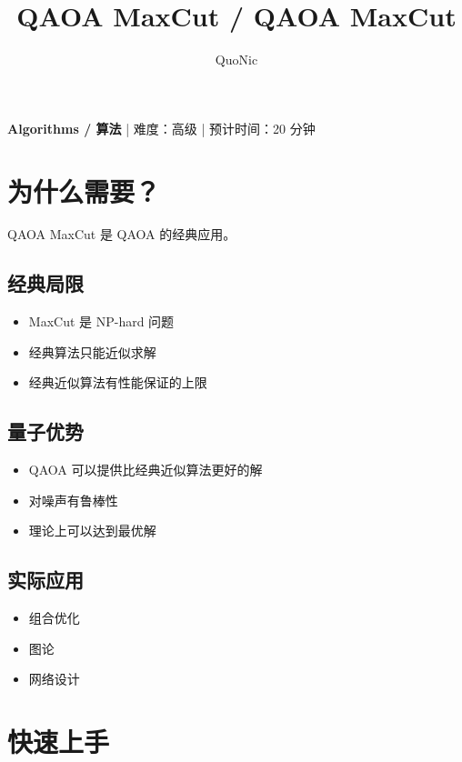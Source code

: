 \documentclass[12pt,a4paper]{article}
\title{QAOA MaxCut / QAOA MaxCut}
\author{QuoNic}
\date{}
\begin{document}
\maketitle

\begin{center}
\textbf{Algorithms / 算法} | 难度：高级 | 预计时间：20 分钟
\end{center}

\tableofcontents
\newpage

\section{为什么需要？}

QAOA MaxCut 是 QAOA 的经典应用。

\subsection{经典局限}
\begin{itemize}
  \item MaxCut 是 NP-hard 问题
  \item 经典算法只能近似求解
  \item 经典近似算法有性能保证的上限
\end{itemize}

\subsection{量子优势}
\begin{itemize}
  \item QAOA 可以提供比经典近似算法更好的解
  \item 对噪声有鲁棒性
  \item 理论上可以达到最优解
\end{itemize}

\subsection{实际应用}
\begin{itemize}
  \item 组合优化
  \item 图论
  \item 网络设计
\end{itemize}

\section{快速上手}
\end{document}
